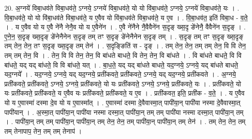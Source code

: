 \documentclass[17pt]{extarticle}
\begin{document}
20. अ॒ग्नये॑ विबा॒धव॑ते विबा॒धव॑ते॒ ऽग्नये॒ ऽग्नये॑ विबा॒धव॑ते॒ यो यो वि॑बा॒धव॑ते॒ ऽग्नये॒ ऽग्नये॑ विबा॒धव॑ते॒ यः । . वि॒बा॒धव॑ते॒ यो यो वि॑बा॒धव॑ते विबा॒धव॑ते॒ य ए॒वैव यो वि॑बा॒धव॑ते विबा॒धव॑ते॒ य ए॒व । . वि॒बा॒धव॑त॒ इति॑ विबा॒ध - व॒ते॒ । . य ए॒वैव यो य ए॒वै ने॑नै नेनै॒व यो य ए॒वैने॑न । . ए॒वै ने॑नैने नै॒वैवैने॑न स॒दृङ् ख्स॒दृ ङे॑नेनै॒ वैवैने॑न स॒दृङ् । . ए॒ने॒न॒ स॒दृङ् ख्स॒दृङ् ङे॑नेनैनेन स॒दृङ् तम् तꣳ स॒दृङ् ङे॑नेनैनेन स॒दृङ् तम् । . स॒दृङ् तम् तꣳ स॒दृङ् ख्स॒दृङ् तम् तेन॒ तेन॒ तꣳ स॒दृङ् ख्स॒दृङ् तम् तेन॑ । . स॒दृङ्ङिति॑ स - दृङ् । . तम् तेन॒ तेन॒ तम् तम् तेन॒ वि वि तेन॒ तम् तम् तेन॒ वि । . तेन॒ वि वि तेन॒ तेन॒ वि बा॑धते बाधते॒ वि तेन॒ तेन॒ वि बा॑धते । . वि बा॑धते बाधते॒ वि वि बा॑धते॒ यद् यद् बा॑धते॒ वि वि बा॑धते॒ यत् । . बा॒ध॒ते॒ यद् यद् बा॑धते बाधते॒ यद॒ग्नये॒ ऽग्नये॒ यद् बा॑धते बाधते॒ यद॒ग्नये᳚ । . यद॒ग्नये॒ ऽग्नये॒ यद् यद॒ग्नये॒ प्रती॑कवते॒ प्रती॑कवते॒ ऽग्नये॒ यद् यद॒ग्नये॒ प्रती॑कवते । . अ॒ग्नये॒ प्रती॑कवते॒ प्रती॑कवते॒ ऽग्नये॒ ऽग्नये॒ प्रती॑कवते॒ यो यः प्रती॑कवते॒ ऽग्नये॒ ऽग्नये॒ प्रती॑कवते॒ यः । . प्रती॑कवते॒ यो यः प्रती॑कवते॒ प्रती॑कवते॒ य ए॒वैव यः प्रती॑कवते॒ प्रती॑कवते॒ य ए॒व । . प्रती॑कवत॒ इति॒ प्रती॑क - व॒ते॒ । . य ए॒वैव यो य ए॒वास्मा॑ दस्मा दे॒व यो य ए॒वास्मा᳚त् । . ए॒वास्मा॑ दस्मा दे॒वैवास्मा॒त् पापी॑या॒न् पापी॑या नस्मा दे॒वैवास्मा॒त् पापी॑यान् । . अ॒स्मा॒त् पापी॑या॒न् पापी॑या नस्मा दस्मा॒त् पापी॑या॒न् तम् तम् पापी॑या नस्मा दस्मा॒त् पापी॑या॒न् तम् । . पापी॑या॒न् तम् तम् पापी॑या॒न् पापी॑या॒न् तम् तेन॒ तेन॒ तम् पापी॑या॒न् पापी॑या॒न् तम् तेन॑ । . तम् तेन॒ तेन॒ तम् तम् तेनापाप॒ तेन॒ तम् तम् तेनाप॑ । \newline
\end{document}
